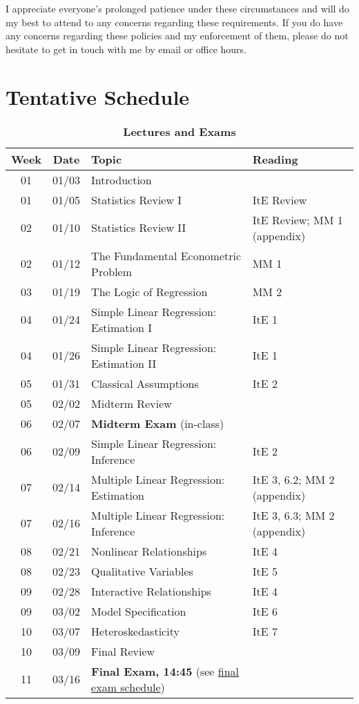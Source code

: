 \documentclass[10pt]{article}
\newcommand{\ra}[1]{\renewcommand{\arraystretch}{#1}}
\begin{document}
\bigskip

\noindent I appreciate everyone's prolonged patience under these circumstances and will do my best to attend to any concerns regarding these requirements.
If you do have any concerns regarding these policies and my enforcement of them, please do not hesitate to get in touch with me by email or office hours. 


\newpage
\section*{Tentative Schedule}

\begin{table}[h!]
	\caption*{\large\textbf{Lectures and Exams}}
	\centering
	\ra{1.5}
	\begin{tabular}{@{\extracolsep{0.5cm}} c c l l @{}}
		\toprule
		\textbf{Week} & \textbf{Date} & \textbf{Topic} & \textbf{Reading}  \\ \toprule
		01 & 01/03 & Introduction & \\
		01 & 01/05 & Statistics Review I & ItE Review \\
		02 & 01/10 & Statistics Review II & ItE Review; MM 1 (appendix) \\
		02 & 01/12 & The Fundamental Econometric Problem & MM 1 \\
		03 & 01/19 & The Logic of Regression & MM 2  \\
		04 & 01/24 & Simple Linear Regression: Estimation I & ItE 1  \\ 
		04 & 01/26 & Simple Linear Regression: Estimation II & ItE 1\\ 
		05 & 01/31 & Classical Assumptions & ItE 2   \\ 
		05 & 02/02 & Midterm Review & \\ \midrule
		06 & 02/07 & \textbf{Midterm Exam} (in-class) & \\ \midrule
		06 & 02/09 & Simple Linear Regression: Inference & ItE 2 \\
		07 & 02/14 & Multiple Linear Regression: Estimation & ItE 3, 6.2; MM 2 (appendix) \\
		07 & 02/16 & Multiple Linear Regression: Inference & ItE 3, 6.3; MM 2 (appendix) \\
		08 & 02/21 & Nonlinear Relationships  &  ItE 4  \\ 
		08 & 02/23 & Qualitative Variables & ItE 5 \\ 
		09 & 02/28 & Interactive Relationships & ItE 4  \\
		09 & 03/02 & Model Specification & ItE 6  \\
		10 & 03/07 & Heteroskedasticity &  ItE 7 \\
		10 & 03/09 & Final Review &   \\ \midrule
		11 & 03/16 & \textbf{Final Exam, 14:45} (see \href{https://registrar.uoregon.edu/calendars/examinations#complete-final-exam-schedule}{final exam schedule}) & \\
		\bottomrule
	\end{tabular}
\end{table}
\end{document}
